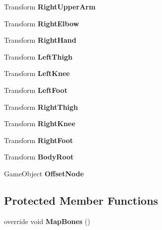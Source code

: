 \begin{DoxyCompactItemize}
Transform {\bfseries Right\+Upper\+Arm}
\item 
\mbox{\label{class_avatar_controller_classic_a0cf9155892c5c20e4325fa60d7bd6c93}} 
Transform {\bfseries Right\+Elbow}
\item 
\mbox{\label{class_avatar_controller_classic_ab04e972e968066bbe478b6dafb6cd5cc}} 
Transform {\bfseries Right\+Hand}
\item 
\mbox{\label{class_avatar_controller_classic_abdaa0f6fcfdba8732ae3a8ca755b701c}} 
Transform {\bfseries Left\+Thigh}
\item 
\mbox{\label{class_avatar_controller_classic_a2d69632d51cfde22f2f079fe22377b4c}} 
Transform {\bfseries Left\+Knee}
\item 
\mbox{\label{class_avatar_controller_classic_a1309a404f5eb0e6f490b34c478ae6a4a}} 
Transform {\bfseries Left\+Foot}
\item 
\mbox{\label{class_avatar_controller_classic_a7f2e10dd1348f43424b0643069aa65d5}} 
Transform {\bfseries Right\+Thigh}
\item 
\mbox{\label{class_avatar_controller_classic_a855339b88da04039c0ac16c948a6a9f3}} 
Transform {\bfseries Right\+Knee}
\item 
\mbox{\label{class_avatar_controller_classic_a6716f886168649b4e4e9802cc0e00a3b}} 
Transform {\bfseries Right\+Foot}
\item 
\mbox{\label{class_avatar_controller_classic_a1c5bc5fe7afb26d985a137698c60fa70}} 
Transform {\bfseries Body\+Root}
\item 
\mbox{\label{class_avatar_controller_classic_aaf423bc11650d0bc49fd8fe6266c94ad}} 
Game\+Object {\bfseries Offset\+Node}
\end{DoxyCompactItemize}
\subsection*{Protected Member Functions}
\begin{DoxyCompactItemize}
\item 
\mbox{\label{class_avatar_controller_classic_a2f29066ac96cf8bcd12a8c2c982e0c17}} 
override void {\bfseries Map\+Bones} ()
\end{DoxyCompactItemize}
